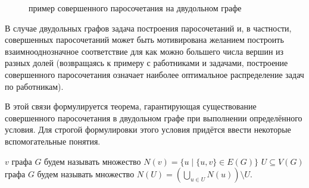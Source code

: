 \begin{figure}[ht!]
    \center
    \label{fig:graphs:perfect_match}
    \caption{пример совершенного паросочетания на двудольном графе}
\end{figure}


В случае двудольных графов задача построения паросочетаний и, в частности,
совершенных паросочетаний может быть мотивирована желанием построить взаимнооднозначное соответствие для как можно большего числа вершин из разных долей
(возвращаясь к примеру с работниками и задачами, построение совершенного паросочетания означает наиболее оптимальное распределение задач по работникам).

В этой связи формулируется теорема, гарантирующая существование совершенного паросочетания в двудольном графе при выполнении определённого условия.
Для строгой формулировки этого условия придётся ввести некоторые вспомогательные понятия.

\begin{definition}
     $ v $ графа $ G $ будем называть множество $ N(v) = \{ u \mid \{u, v\} \in E(G) \} $
    \newline
     $ U \subseteq V(G) $ графа $ G $ будем называть множество $ N(U) = \left( \bigcup_{u \in U} N(u) \right) \setminus U $.
\end{definition}

